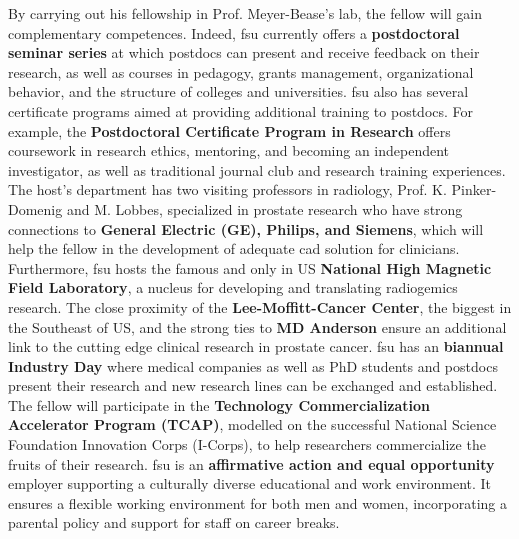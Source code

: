 By carrying out his fellowship in Prof. Meyer-Bease's lab, the fellow will gain complementary competences.
Indeed, \ac{fsu} currently offers a \textbf{postdoctoral seminar series} at which postdocs can present and receive feedback on their research, as well as courses in pedagogy, grants management, organizational behavior, and the structure of colleges and universities.
\ac{fsu} also has several certificate programs aimed at providing additional training to postdocs.
For example, the \textbf{Postdoctoral Certificate Program in Research} offers coursework in research ethics, mentoring, and becoming an independent investigator, as well as traditional journal club and research training experiences.
The host's department has two visiting professors in radiology, Prof. K. Pinker-Domenig and M. Lobbes, specialized in prostate research who have strong connections to \textbf{General Electric (GE), Philips, and Siemens}, which will help the fellow in the development of adequate \ac{cad} solution for clinicians.
Furthermore, \ac{fsu} hosts the famous and only in US \textbf{National High Magnetic Field Laboratory}, a nucleus for developing and translating radiogemics research.
The close proximity of the \textbf{Lee-Moffitt-Cancer Center}, the biggest in the Southeast of US, and the strong ties to \textbf{MD Anderson} ensure an additional link to the cutting edge clinical research in prostate cancer.
\ac{fsu} has an \textbf{biannual Industry Day} where medical companies as well as PhD students and postdocs present their research and new research lines can be exchanged and established.
The fellow will participate in the \textbf{Technology Commercialization Accelerator Program (TCAP)}, modelled on the successful National Science Foundation Innovation Corps (I-Corps), to help researchers commercialize the fruits of their research.
\ac{fsu} is an \textbf{affirmative action and equal opportunity} employer supporting a culturally diverse educational and work environment.
It ensures a flexible working environment for both men and women, incorporating a parental policy and support for staff on career breaks.

